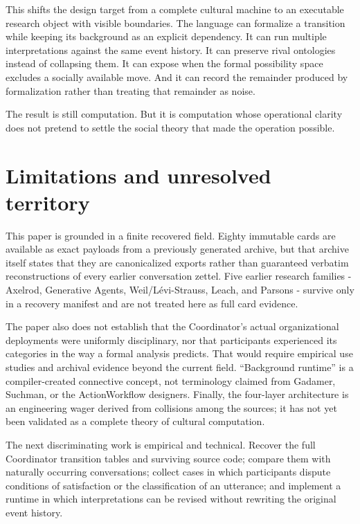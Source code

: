 \documentclass[11pt]{article}
\begin{document}
This shifts the design target from a complete cultural machine to an executable research object with visible boundaries. The language can formalize a transition while keeping its background as an explicit dependency. It can run multiple interpretations against the same event history. It can preserve rival ontologies instead of collapsing them. It can expose when the formal possibility space excludes a socially available move. And it can record the remainder produced by formalization rather than treating that remainder as noise.\par

The result is still computation. But it is computation whose operational clarity does not pretend to settle the social theory that made the operation possible.\par

\section{Limitations and unresolved territory}

This paper is grounded in a finite recovered field. Eighty immutable cards are available as exact payloads from a previously generated archive, but that archive itself states that they are canonicalized exports rather than guaranteed verbatim reconstructions of every earlier conversation zettel. Five earlier research families - Axelrod, Generative Agents, Weil/Lévi-Strauss, Leach, and Parsons - survive only in a recovery manifest and are not treated here as full card evidence.\par

The paper also does not establish that the Coordinator's actual organizational deployments were uniformly disciplinary, nor that participants experienced its categories in the way a formal analysis predicts. That would require empirical use studies and archival evidence beyond the current field. “Background runtime” is a compiler-created connective concept, not terminology claimed from Gadamer, Suchman, or the ActionWorkflow designers. Finally, the four-layer architecture is an engineering wager derived from collisions among the sources; it has not yet been validated as a complete theory of cultural computation.\par

The next discriminating work is empirical and technical. Recover the full Coordinator transition tables and surviving source code; compare them with naturally occurring conversations; collect cases in which participants dispute conditions of satisfaction or the classification of an utterance; and implement a runtime in which interpretations can be revised without rewriting the original event history.\par
\end{document}
